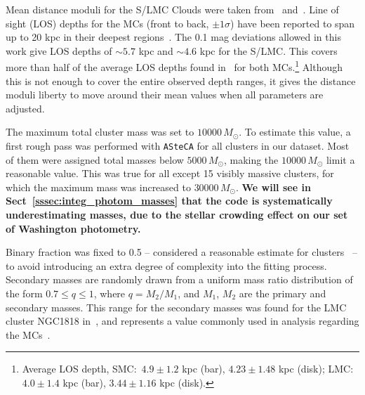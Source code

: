 \documentclass{aa}
\begin{document}
Mean distance moduli for the S/LMC Clouds were taken
from~\cite{de_Grijs_2015} and~\cite{de_Grijs_2014}.
%
Line of sight (LOS) depths for the MCs (front to back, $\pm1\sigma$) have been
reported to span up to 20 kpc in their deepest
regions~\citep{Subramanian_2009,Nidever_2013,Scowcroft_2015}.
%
The 0.1 mag deviations allowed in this work give LOS depths of ${\sim}5.7$ kpc
and ${\sim}4.6$ kpc for the S/LMC\@. This covers more than half of the average
LOS depths found in~\cite{Subramanian_2009} for both MCs.\footnote
{Average LOS depth, SMC:\ $4.9\pm1.2$ kpc (bar), $4.23\pm1.48$ kpc 
(disk); LMC:\ $4.0\pm1.4$ kpc (bar), $3.44\pm1.16$ kpc (disk).}
Although this is not enough to cover the entire observed depth ranges, it gives
the distance moduli liberty to move around their mean values when all parameters
are adjusted.

The maximum total cluster mass was set to $10000\,M_{\odot}$.
%
To estimate this value, a first rough pass was performed with
\texttt{ASteCA} for all clusters in our dataset. Most of them were assigned
total masses below $5000\,M_{\odot}$, making the $10000\,M_{\odot}$ limit a
reasonable value.
%
This was true for all except 15 visibly massive clusters, for which the
maximum mass was increased to $30000\,M_{\odot}$. \textbf{We will see
in Sect~\ref{sssec:integ_photom_masses} that the code is systematically
underestimating masses, due to the stellar crowding effect on our set of
Washington photometry.}

Binary fraction was fixed to 0.5 -- considered a
reasonable estimate for clusters~\citep{von_Hippel_2005,Sollima_2010} -- to
avoid introducing an extra degree of complexity into the fitting process.
Secondary masses are randomly drawn from a uniform mass ratio distribution of
the form $0.7{\le}q{\le}1$, where $q{=}M_2/M_1$, and $M_1$, $M_2$ are the
primary and secondary masses. This range for the secondary masses was found for
the LMC cluster NGC1818 in~\cite{Elson_1998}, and represents a value
commonly used in analysis regarding the MCs~\citep[see][and references therein]
{Rubele_2011}.
\end{document}
